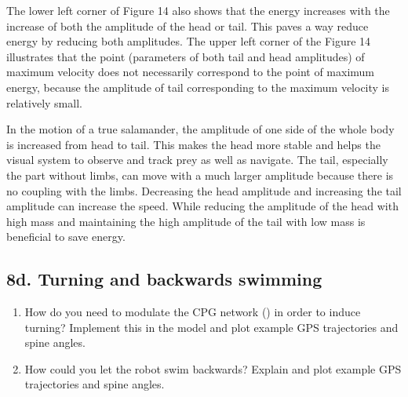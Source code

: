 \documentclass{cmc}
\begin{document}
The lower left corner of Figure 14 also shows that the energy increases with the increase of both the amplitude of the head or tail. This paves a way reduce energy by reducing both amplitudes. The upper left corner of the Figure 14 illustrates that the point (parameters of both tail and head amplitudes) of maximum velocity does not necessarily correspond to the point of maximum energy, because the amplitude of tail corresponding to the maximum velocity is relatively small.


In the motion of a true salamander, the amplitude of one side of the whole body is increased from head to tail. This makes the head more stable and helps the visual system to observe and track prey as well as navigate. The tail, especially the part without limbs,
can move with a much larger amplitude because there is no coupling with the limbs. Decreasing the head amplitude and increasing the tail amplitude can increase the speed. While reducing the amplitude of the head with high mass and maintaining the high amplitude of the tail with low mass is beneficial to save energy.



\subsection*{8d. Turning and backwards swimming}
\label{sec:turning-backwards}

\begin{enumerate}
\item How do you need to modulate the CPG network () in order
  to induce turning?  Implement this in the model and plot example GPS
  trajectories and spine angles.
\item How could you let the robot swim backwards? Explain and plot example GPS
  trajectories and spine angles.
\end{enumerate}
\end{document}
